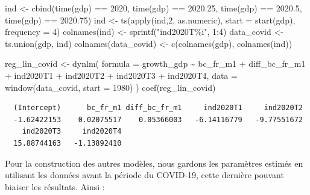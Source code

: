 \documentclass[
  a4paper,
  DIV=11,
  numbers=noendperiod,
  french]{scrartcl}
\newenvironment{Shaded}{\begin{snugshade}}{\end{snugshade}}
\newcommand{\AttributeTok}[1]{\textcolor[rgb]{0.40,0.45,0.13}{#1}}
\newcommand{\DecValTok}[1]{\textcolor[rgb]{0.68,0.00,0.00}{#1}}
\newcommand{\FloatTok}[1]{\textcolor[rgb]{0.68,0.00,0.00}{#1}}
\newcommand{\FunctionTok}[1]{\textcolor[rgb]{0.28,0.35,0.67}{#1}}
\newcommand{\NormalTok}[1]{\textcolor[rgb]{0.00,0.23,0.31}{#1}}
\newcommand{\OtherTok}[1]{\textcolor[rgb]{0.00,0.23,0.31}{#1}}
\newcommand{\SpecialCharTok}[1]{\textcolor[rgb]{0.37,0.37,0.37}{#1}}
\newcommand{\StringTok}[1]{\textcolor[rgb]{0.13,0.47,0.30}{#1}}
\newcommand\1{{\mathds 1}}
\theoremstyle{remark}
\begin{document}
\begin{Shaded}
\begin{Highlighting}[]
\NormalTok{ind }\OtherTok{\textless{}{-}} \FunctionTok{cbind}\NormalTok{(}\FunctionTok{time}\NormalTok{(gdp) }\SpecialCharTok{==} \DecValTok{2020}\NormalTok{, }\FunctionTok{time}\NormalTok{(gdp) }\SpecialCharTok{==} \FloatTok{2020.25}\NormalTok{, }
             \FunctionTok{time}\NormalTok{(gdp) }\SpecialCharTok{==} \FloatTok{2020.5}\NormalTok{, }\FunctionTok{time}\NormalTok{(gdp) }\SpecialCharTok{==} \FloatTok{2020.75}\NormalTok{)}
\NormalTok{ind }\OtherTok{\textless{}{-}} \FunctionTok{ts}\NormalTok{(}\FunctionTok{apply}\NormalTok{(ind,}\DecValTok{2}\NormalTok{, as.numeric), }\AttributeTok{start =} \FunctionTok{start}\NormalTok{(gdp), }\AttributeTok{frequency =} \DecValTok{4}\NormalTok{)}
\FunctionTok{colnames}\NormalTok{(ind) }\OtherTok{\textless{}{-}} \FunctionTok{sprintf}\NormalTok{(}\StringTok{"ind2020T\%i"}\NormalTok{, }\DecValTok{1}\SpecialCharTok{:}\DecValTok{4}\NormalTok{)}
\NormalTok{data\_covid }\OtherTok{\textless{}{-}} \FunctionTok{ts.union}\NormalTok{(gdp, ind)}
\FunctionTok{colnames}\NormalTok{(data\_covid) }\OtherTok{\textless{}{-}} \FunctionTok{c}\NormalTok{(}\FunctionTok{colnames}\NormalTok{(gdp), }\FunctionTok{colnames}\NormalTok{(ind))}

\NormalTok{reg\_lin\_covid }\OtherTok{\textless{}{-}} \FunctionTok{dynlm}\NormalTok{(}
  \AttributeTok{formula =}\NormalTok{ growth\_gdp }\SpecialCharTok{\textasciitilde{}}\NormalTok{ bc\_fr\_m1 }\SpecialCharTok{+}\NormalTok{ diff\_bc\_fr\_m1 }\SpecialCharTok{+}
\NormalTok{    ind2020T1 }\SpecialCharTok{+}\NormalTok{ ind2020T2 }\SpecialCharTok{+}\NormalTok{ ind2020T3 }\SpecialCharTok{+}\NormalTok{ ind2020T4,}
  \AttributeTok{data =} \FunctionTok{window}\NormalTok{(data\_covid, }\AttributeTok{start =} \DecValTok{1980}\NormalTok{)}
\NormalTok{)}
\FunctionTok{coef}\NormalTok{(reg\_lin\_covid)}
\end{Highlighting}
\end{Shaded}

\begin{verbatim}
  (Intercept)      bc_fr_m1 diff_bc_fr_m1     ind2020T1     ind2020T2 
  -1.62422153    0.02075517    0.05366003   -6.14116779   -9.77551672 
    ind2020T3     ind2020T4 
  15.88744163   -1.13892410 
\end{verbatim}

Pour la construction des autres modèles, nous gardons les paramètres
estimés en utilisant les données avant la période du COVID-19, cette
dernière pouvant biaiser les résultats. Ainsi :
\end{document}
